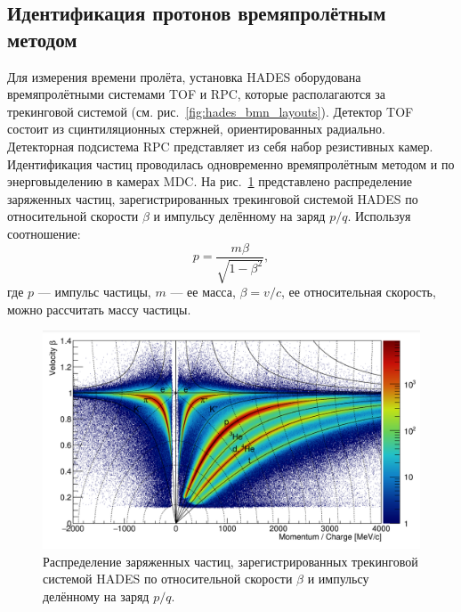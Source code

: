 \subsection{Идентификация протонов времяпролётным методом}

Для измерения времени пролёта, установка HADES оборудована времяпролётными системами TOF и RPC, которые располагаются за трекинговой системой (см. рис.~\ref{fig:hades_bmn_layouts}).
Детектор TOF состоит из сцинтиляционных стержней, ориентированных радиально.
Детекторная подсистема RPC представляет из себя набор резистивных камер.
Идентификация частиц проводилась одновременно времяпролётным методом и по энерговыделению в камерах MDC.
На рис.~\ref{fig:hades_pid} представлено распределение заряженных частиц, зарегистрированных трекинговой системой HADES по относительной скорости $\beta$ и импульсу делённому на заряд $p/q$.
Используя соотношение:
\begin{equation}
    p = \frac{ m\beta }{ \sqrt{1-\beta^2} },
\end{equation}
где $p$ --- импульс частицы, $m$ --- ее масса, $\beta=v/c$, ее относительная скорость, можно рассчитать массу частицы.
%
\begin{figure}[ht]
    \begin{center}
    \includegraphics[width=0.95\linewidth]{images/hades_pid_plot.png}
    \caption{Распределение заряженных частиц, зарегистрированных трекинговой системой HADES по относительной скорости $\beta$ и импульсу делённому на заряд $p/q$.}
    \label{fig:hades_pid}
    \end{center}
    \end{figure}
    
